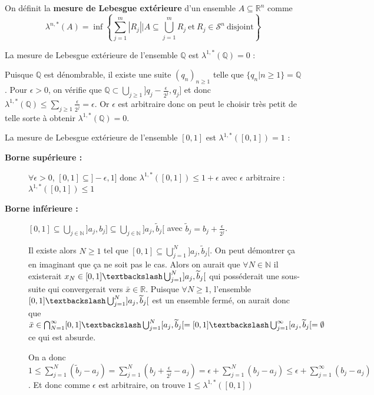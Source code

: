 \begin{definition}
    On définit la \textbf{mesure de Lebesgue extérieure} d'un ensemble $A\subseteq\mathbb{R}^n$ comme
    \begin{equation*}
        \lambda^{n,*}(A) = \inf\left\{\sum_{j=1}^m|R_j| \Big| A \subseteq \bigcup_{j=1}^m R_j \ \text{et}\ R_j\in\mathscr{S}^n\ \text{disjoint}\right\}
    \end{equation*}
\end{definition}

\begin{example}
    La mesure de Lebesgue extérieure de l'ensemble $\mathbb{Q}$ est $\lambda^{1,*}(\mathbb{Q})=0$ :
    
    Puisque $\mathbb{Q}$ est dénombrable, il existe une suite $(q_n)_{n\geq1}$ telle que $\{q_n\big|n\geq1\}=\mathbb{Q}$. Pour $\epsilon>0$, on vérifie que $\mathbb{Q}\subset\bigcup_{j\geq1}]q_j-\frac{\epsilon}{2^j},q_j]$ et donc $\lambda^{1,*}(\mathbb{Q})\leq\sum_{j\geq1}\frac{\epsilon}{2^j}=\epsilon$. Or $\epsilon$ est arbitraire donc on peut le choisir très petit de telle sorte à obtenir $\lambda^{1,*}(\mathbb{Q})=0$.
\end{example}

\begin{example}
    La mesure de Lebesgue extérieure de l'ensemble $[0,1]$ est $\lambda^{1,*}([0,1])=1$ :
    
    \begin{description}
        \item[\textbf{Borne supérieure :}] $\forall \epsilon>0$, $[0,1] \subseteq ]-\epsilon,1]$ donc $\lambda^{1,*}([0,1])\leq1+\epsilon$ avec $\epsilon$ arbitraire : $\lambda^{1,*}([0,1])\leq1$
        \item[\textbf{Borne inférieure :}] $[0,1]\subseteq\bigcup_{j\in\mathbb{N}}]a_j,b_j]\subseteq\bigcup_{j\in\mathbb{N}}]a_j,\widetilde{b}_j[$ avec $\widetilde{b}_j=b_j+\frac{\epsilon}{2^j}$.
        
        Il existe alors $N\geq1$ tel que $[0,1]\subseteq\bigcup_{j=1}^N]a_j,\widetilde{b}_j[$. On peut démontrer ça en imaginant que ça ne soit pas le cas. Alors on aurait que $\forall N\in\mathbb{N}$ il existerait $x_N\in[0,1]\textbackslash\bigcup_{j=1}^N]a_j,\widetilde{b}_j[$ qui posséderait une sous-suite qui convergerait vers $\bar{x}\in\mathbb{R}$. Puisque $\forall N\geq1$, l'ensemble $[0,1]\textbackslash\bigcup_{j=1}^N]a_j,\widetilde{b}_j[$ est un ensemble fermé, on aurait donc que $\bar{x}\in\bigcap_{N=1}^\infty[0,1]\textbackslash\bigcup_{j=1}^N[a_j,\widetilde{b}_j[=[0,1]\textbackslash\bigcup_{j=1}^\infty[a_j,\widetilde{b}_j[=\emptyset$ ce qui est absurde.
        
        On a donc $1\leq\sum_{j=1}^N(\widetilde{b}_j-a_j) = \sum_{j=1}^N(b_j+\frac{\epsilon}{2^j}-a_j)=\epsilon + \sum_{j=1}^N(b_j-a_j) \leq \epsilon + \sum_{j=1}^\infty(b_j-a_j)$. Et donc comme $\epsilon$ est arbitraire, on trouve $1\leq\lambda^{1,*}([0,1])$
    \end{description}
\end{example}

